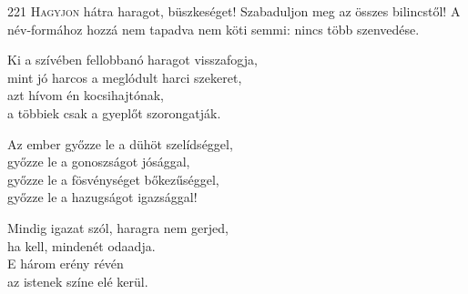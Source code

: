 
\begin{firstdhpverse}{221}
\lettrine{H}{agyjon} {\LettrineTextFont hátra haragot, büszkeséget!}\newline
Szabaduljon meg az összes bilincstől!\newline
A név-formához hozzá nem tapadva\newline
nem köti semmi: nincs több szenvedése.
\end{firstdhpverse}

\begin{dhpverse}

 Ki a szívében fellobbanó haragot visszafogja,\\
mint jó harcos a meglódult harci szekeret,\\
azt hívom én kocsihajtónak,\\
a többiek csak a gyeplőt szorongatják.

 Az ember győzze le a dühöt szelídséggel,\\
győzze le a gonoszságot jósággal,\\
győzze le a fösvénységet bőkezűséggel,\\
győzze le a hazugságot igazsággal!

 Mindig igazat szól, haragra nem gerjed,\\
ha kell, mindenét odaadja.\\
E három erény révén\\
az istenek színe elé kerül.

\end{dhpverse}
\newpage
